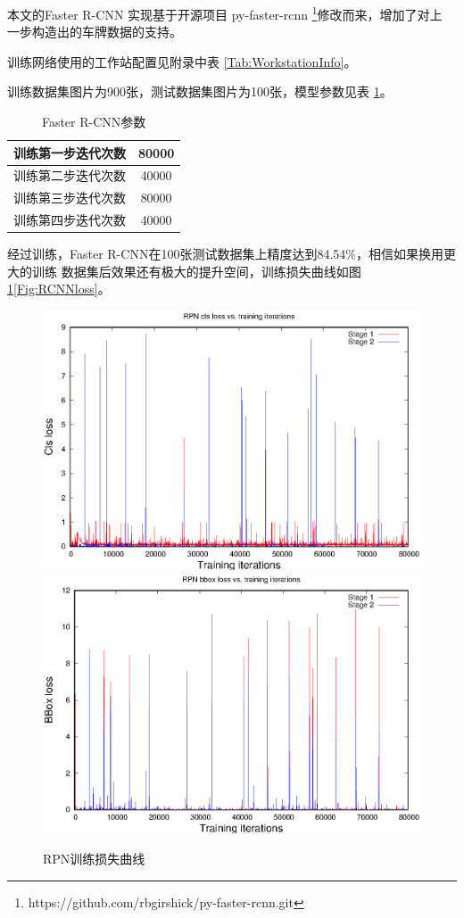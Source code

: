 本文的Faster R-CNN 实现基于开源项目 py-faster-rcnn
\footnote{https://github.com/rbgirshick/py-faster-rcnn.git}修改而来，增加了对上
一步构造出的车牌数据的支持。

训练网络使用的工作站配置见附录中表 \ref{Tab:WorkstationInfo}。

训练数据集图片为900张，测试数据集图片为100张，模型参数见表 \ref{Tab:FasterRCNNArgs}。

\begin{table}[ht]
\centering
\caption{Faster R-CNN参数}\label{Tab:FasterRCNNArgs}
\begin{tabular}{|c|c|}
\hline
训练第一步迭代次数 & 80000 \\
\hline
训练第二步迭代次数 & 40000 \\
\hline 
训练第三步迭代次数 & 80000 \\
\hline 
训练第四步迭代次数 & 40000 \\
\hline
\end{tabular}
\end{table}

经过训练，Faster R-CNN在100张测试数据集上精度达到84.54\%，相信如果换用更大的训练
数据集后效果还有极大的提升空间，训练损失曲线如图\ref{Fig:RPNloss}\ref{Fig:RCNNloss}。

\begin{figure}[ht]
\centering
{}
{\includegraphics[width=0.8\linewidth]{./Figure/RPNClsLoss.eps}}
{\includegraphics[width=0.8\linewidth]{./Figure/RPNBBoxLoss.eps}}
\caption{RPN训练损失曲线}\label{Fig:RPNloss}
\end{figure}

